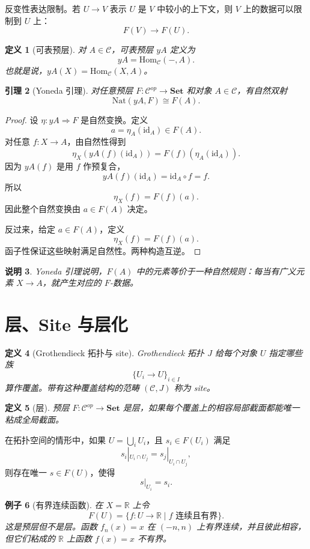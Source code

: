 \documentclass[UTF8,11pt,fontset=none]{ctexart}
\newtheorem{definition}{定义}[section]
\newtheorem{lemma}[definition]{引理}
\newtheorem{remark}[definition]{说明}
\newtheorem{example}[definition]{例子}
\newcommand{\Set}{\mathbf{Set}}
\newcommand{\Hom}{\mathrm{Hom}}
\newcommand{\Nat}{\mathrm{Nat}}
\newcommand{\id}{\mathrm{id}}
\begin{document}
反变性表达限制。若 \(U\to V\) 表示 \(U\) 是 \(V\) 中较小的上下文，则 \(V\) 上的数据可以限制到 \(U\) 上：
\[
F(V)\longrightarrow F(U).
\]

\begin{definition}[可表预层]
对 \(A\in\mathcal C\)，可表预层 \(yA\) 定义为
\[
yA=\Hom_{\mathcal C}(-,A).
\]
也就是说，\(yA(X)=\Hom_{\mathcal C}(X,A)\)。
\end{definition}

\begin{lemma}[Yoneda 引理]
对任意预层 \(F:\mathcal C^{op}\to\Set\) 和对象 \(A\in\mathcal C\)，有自然双射
\[
\Nat(yA,F)\cong F(A).
\]
\end{lemma}

\begin{proof}
设 \(\eta:yA\Rightarrow F\) 是自然变换。定义
\[
a=\eta_A(\id_A)\in F(A).
\]
对任意 \(f:X\to A\)，由自然性得到
\[
\eta_X(yA(f)(\id_A))=F(f)(\eta_A(\id_A)).
\]
因为 \(yA(f)\) 是用 \(f\) 作预复合，
\[
yA(f)(\id_A)=\id_A\circ f=f.
\]
所以
\[
\eta_X(f)=F(f)(a).
\]
因此整个自然变换由 \(a\in F(A)\) 决定。

反过来，给定 \(a\in F(A)\)，定义
\[
\eta_X(f)=F(f)(a).
\]
函子性保证这些映射满足自然性。两种构造互逆。
\end{proof}

\begin{remark}
Yoneda 引理说明，\(F(A)\) 中的元素等价于一种自然规则：每当有广义元素 \(X\to A\)，就产生对应的 \(F\)-数据。
\end{remark}

\section{层、Site 与层化}

\begin{definition}[Grothendieck 拓扑与 site]
Grothendieck 拓扑 \(J\) 给每个对象 \(U\) 指定哪些族
\[
\{U_i\to U\}_{i\in I}
\]
算作覆盖。带有这种覆盖结构的范畴 \((\mathcal C,J)\) 称为 site。
\end{definition}

\begin{definition}[层]
预层 \(F:\mathcal C^{op}\to\Set\) 是层，如果每个覆盖上的相容局部截面都能唯一粘成全局截面。
\end{definition}

在拓扑空间的情形中，如果 \(U=\bigcup_i U_i\)，且 \(s_i\in F(U_i)\) 满足
\[
s_i|_{U_i\cap U_j}=s_j|_{U_i\cap U_j},
\]
则存在唯一 \(s\in F(U)\)，使得
\[
s|_{U_i}=s_i.
\]

\begin{example}[有界连续函数]
在 \(X=\mathbb R\) 上令
\[
F(U)=\{f:U\to\mathbb R\mid f\text{ 连续且有界}\}.
\]
这是预层但不是层。函数 \(f_n(x)=x\) 在 \((-n,n)\) 上有界连续，并且彼此相容，但它们粘成的 \(\mathbb R\) 上函数 \(f(x)=x\) 不有界。
\end{example}
\end{document}
